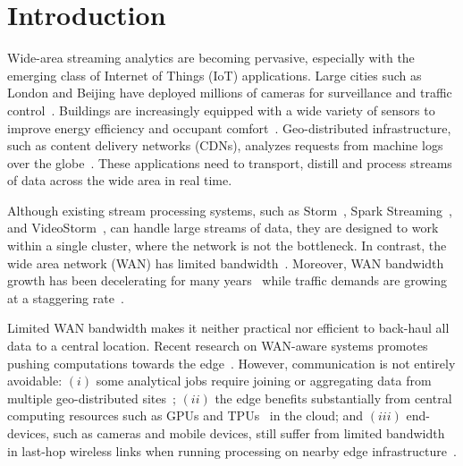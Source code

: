 \section{Introduction}

Wide-area streaming analytics are becoming pervasive, especially with the
emerging class of Internet of Things (IoT) applications.  Large cities such as
London and Beijing have deployed millions of cameras for surveillance and
traffic control~\cite{skynet, london.surveillance}. Buildings are increasingly
equipped with a wide variety of sensors to improve energy efficiency and
occupant comfort~\cite{krioukov2012building}. Geo-distributed infrastructure,
such as content delivery networks (CDNs), analyzes requests from machine logs
over the globe~\cite{mukerjee2015practical}. These applications need to
transport, distill and process streams of data across the wide area in real
time.

Although existing stream processing systems, such as
Storm~\cite{toshniwal2014storm}, Spark Streaming~\cite{zaharia2013discretized},
and VideoStorm~\cite{zhang2017live}, can handle large streams of data, they are
designed to work within a single cluster, where the network is not the
bottleneck.  In contrast, the wide area network (WAN) has limited
bandwidth~\cite{hsieh17gaia, vulimiri2015global}. Moreover, WAN bandwidth growth
has been decelerating for many years~\cite{global2016telegeography} while
traffic demands are growing at a staggering rate~\cite{index2013zettabyte}.

Limited WAN bandwidth makes it neither practical nor efficient to back-haul all
data to a central location.  Recent research on WAN-aware systems promotes
pushing computations towards the edge~\cite{pu2015low, rabkin2014aggregation,
  satyanarayanan2009case}. However, communication is not entirely avoidable:
$(i)$ some analytical jobs require joining or aggregating data from multiple
geo-distributed sites~\cite{pu2015low, viswanathan2016clarinet}; $(ii)$ the edge
benefits substantially from central computing resources such as GPUs and
TPUs~\cite{abadi2016tensorflow} in the cloud; and $(iii)$ end-devices, such as
cameras and mobile devices, still suffer from limited bandwidth in last-hop
wireless links when running processing on nearby edge
infrastructure~\cite{abari2017enabling, zhang2015design}.


